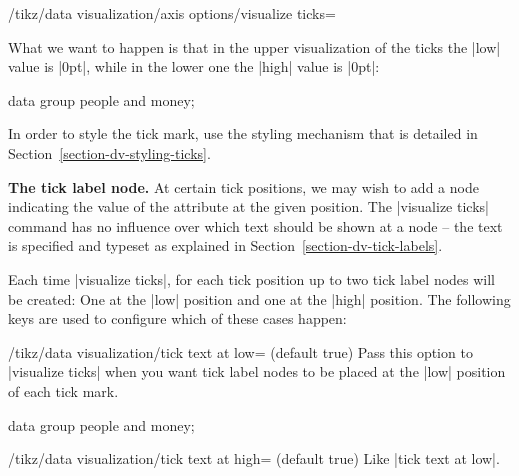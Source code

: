 \begin{key}{/tikz/data visualization/axis options/visualize ticks=}
\begin{itemize}
    What we want to happen is that in the upper visualization of the
    ticks the |low| value is |0pt|, while in the lower one the |high|
    value is |0pt|:    
\begin{codeexample}[]
\tikz \datavisualization [
    our system,
    x axis={attribute=time, length=3cm, ticks=many},
    left axis ={attribute=money},
    right axis={attribute=people},
    visualize as line/.list={people 1, people 2, money 1, money 2}]
  data group {people and money};  
\end{codeexample}
\end{itemize}
  In order to style the tick mark, use the styling mechanism that is
  detailed in Section~\ref{section-dv-styling-ticks}.

  \medskip
  \textbf{The tick label node.}
  At certain tick positions, we may wish to add a node indicating the
  value of the attribute at the given position. The |visualize ticks|
  command has no influence over which text should be shown at a node
  -- the text is specified and typeset as explained in
  Section~\ref{section-dv-tick-labels}.

  Each time |visualize ticks|, for each tick position up to two tick
  label nodes will be created: One at the |low| position and one at
  the |high| position. The following keys are used to configure which
  of these cases happen:
  \begin{key}{/tikz/data visualization/tick text at
      low= (default true)}
    Pass this option to |visualize ticks| when you want tick label
    nodes to be placed at the |low| position of each tick mark.
\begin{codeexample}[]
\tikz \datavisualization [
    our system,
    x axis={attribute=time, length=3cm, ticks=some},
    left axis ={attribute=money},
    right axis={attribute=people},
    visualize as line/.list={people 1, people 2, money 1, money 2}]
  data group {people and money};  
\end{codeexample}
  \end{key}
  \begin{key}{/tikz/data visualization/tick text at
      high= (default true)}
    Like |tick text at low|. 
  \end{key}
  

\end{key}
